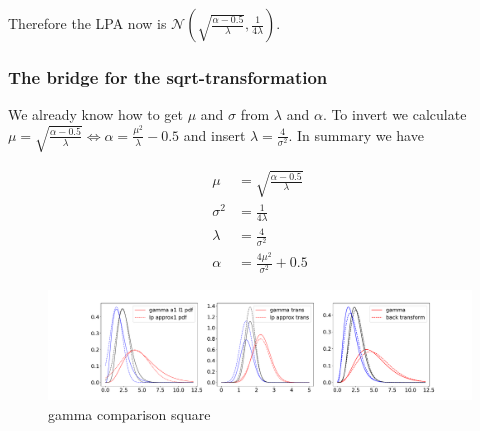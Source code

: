 Therefore the LPA now is $\mathcal{N}\left(\sqrt{\frac{\alpha-0.5}{\lambda}}, \frac{1}{4\lambda} \right)$.

\subsubsection{The bridge for the sqrt-transformation}

We already know how to get $\mu$ and $\sigma$ from $\lambda$ and $\alpha$. To invert we calculate $\mu = \sqrt{\frac{\alpha-0.5}{\lambda}} \Leftrightarrow \alpha = \frac{\mu^2}{\lambda}-0.5$ and insert $\lambda=\frac{4}{\sigma^2}$. In summary we have

\begin{align}
\mu &= \sqrt{\frac{\alpha-0.5}{\lambda}} \\
\sigma^2 &= \frac{1}{4\lambda} \\
\lambda &= \frac{4}{\sigma^2} \\
\alpha &= \frac{4\mu^2}{\sigma^2}+0.5 
\end{align}

\begin{figure}[!htb]
	\centering
	\includegraphics[width=\textwidth]{figures/gamma_playground_sqrt.pdf}
	\caption{gamma comparison square}
	\label{fig:gamma_comparison_square}
\end{figure}